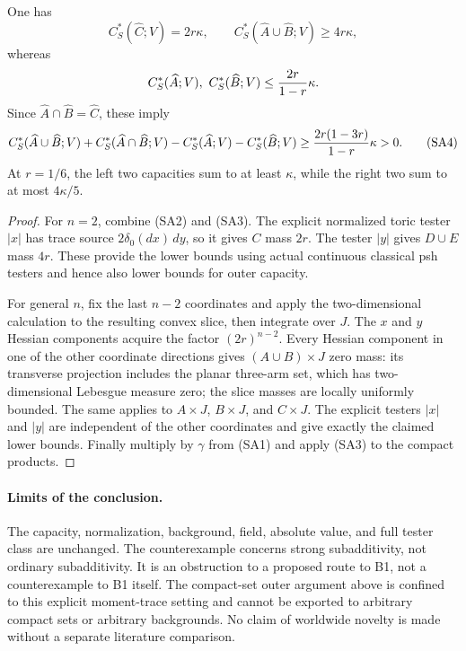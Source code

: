 \begin{proposition}
One has
\[
 C_S^*(\widehat C;V)=2r\kappa,\qquad
 C_S^*(\widehat A\cup\widehat B;V)\ge4r\kappa,
\]
whereas
\[
 C_S^*(\widehat A;V),\ C_S^*(\widehat B;V)
                         \le {2r\over1-r}\kappa.
\]
Since $\widehat A\cap\widehat B=\widehat C$, these imply
\[
 C_S^*(\widehat A\cup\widehat B;V)+C_S^*(\widehat A\cap\widehat B;V)
 -C_S^*(\widehat A;V)-C_S^*(\widehat B;V)
 \ge {2r(1-3r)\over1-r}\kappa>0.
 \tag{SA4}
\]
At $r=1/6$, the left two capacities sum to at least $\kappa$, while the right two sum to at most $4\kappa/5$.
\end{proposition}
\begin{proof}
For $n=2$, combine (SA2) and (SA3). The explicit normalized toric tester $|x|$ has trace source $2\delta_0(dx)\,dy$, so it gives $C$ mass $2r$. The tester $|y|$ gives $D\cup E$ mass $4r$. These provide the lower bounds using actual continuous classical psh testers and hence also lower bounds for outer capacity.

For general $n$, fix the last $n-2$ coordinates and apply the two-dimensional calculation to the resulting convex slice, then integrate over $J$. The $x$ and $y$ Hessian components acquire the factor $(2r)^{n-2}$. Every Hessian component in one of the other coordinate directions gives $(A\cup B)\times J$ zero mass: its transverse projection includes the planar three-arm set, which has two-dimensional Lebesgue measure zero; the slice masses are locally uniformly bounded. The same applies to $A\times J$, $B\times J$, and $C\times J$. The explicit testers $|x|$ and $|y|$ are independent of the other coordinates and give exactly the claimed lower bounds. Finally multiply by $\gamma$ from (SA1) and apply (SA3) to the compact products.
\end{proof}

\paragraph{Limits of the conclusion.}
The capacity, normalization, background, field, absolute value, and full tester class are unchanged. The counterexample concerns strong subadditivity, not ordinary subadditivity. It is an obstruction to a proposed route to B1, not a counterexample to B1 itself. The compact-set outer argument above is confined to this explicit moment-trace setting and cannot be exported to arbitrary compact sets or arbitrary backgrounds. No claim of worldwide novelty is made without a separate literature comparison.
